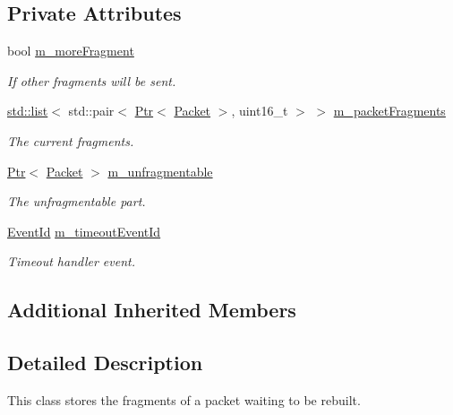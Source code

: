\subsection*{Private Attributes}
\begin{DoxyCompactItemize}
\item 
bool \hyperlink{classns3_1_1Ipv6ExtensionFragment_1_1Fragments_a9264a9faedafcd55c98f5a9408ec23d9}{m\+\_\+more\+Fragment}
\begin{DoxyCompactList}\small\item\em If other fragments will be sent. \end{DoxyCompactList}\item 
\hyperlink{openflow-interface_8h_afd9bcfa176617760671b67580f536fa7}{std\+::list}$<$ std\+::pair$<$ \hyperlink{classns3_1_1Ptr}{Ptr}$<$ \hyperlink{classns3_1_1Packet}{Packet} $>$, uint16\+\_\+t $>$ $>$ \hyperlink{classns3_1_1Ipv6ExtensionFragment_1_1Fragments_a247578d26bb68bfcdff2014cf8d1c5c2}{m\+\_\+packet\+Fragments}
\begin{DoxyCompactList}\small\item\em The current fragments. \end{DoxyCompactList}\item 
\hyperlink{classns3_1_1Ptr}{Ptr}$<$ \hyperlink{classns3_1_1Packet}{Packet} $>$ \hyperlink{classns3_1_1Ipv6ExtensionFragment_1_1Fragments_a984aec2a43c2fb5a909637fc25ace14d}{m\+\_\+unfragmentable}
\begin{DoxyCompactList}\small\item\em The unfragmentable part. \end{DoxyCompactList}\item 
\hyperlink{classns3_1_1EventId}{Event\+Id} \hyperlink{classns3_1_1Ipv6ExtensionFragment_1_1Fragments_a5a2c426ed3fed107b7aa774a2f277600}{m\+\_\+timeout\+Event\+Id}
\begin{DoxyCompactList}\small\item\em Timeout handler event. \end{DoxyCompactList}\end{DoxyCompactItemize}
\subsection*{Additional Inherited Members}


\subsection{Detailed Description}
This class stores the fragments of a packet waiting to be rebuilt. 


